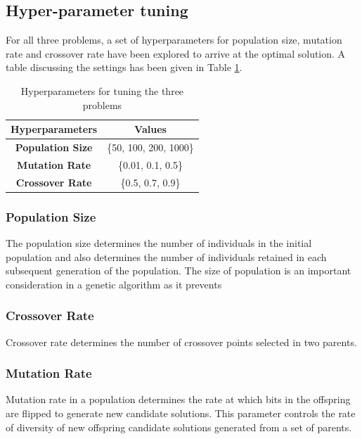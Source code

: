 \documentclass{article}
\begin{document}
\subsection{Hyper-parameter tuning}
For all three problems, a set of hyperparameters for population size, mutation rate and crossover rate have been explored to arrive at the optimal solution. A table discussing the settings has been given in Table \ref{tab:hyperparameter-tuning}. 
\begin{table}[h!]
    \centering
    \begin{tabular}{|c|c|} \hline 
        \textbf{Hyperparameters} & \textbf{Values}  \\ \hline
        \textbf{Population Size} & \{50, 100, 200, 1000\}  \\ \hline
        \textbf{Mutation Rate}   & \{0.01, 0.1, 0.5\} \\ \hline  
        \textbf{Crossover Rate}  & \{0.5, 0.7, 0.9\} \\ \hline
    \end{tabular}
    \caption{Hyperparameters for tuning the three problems}
    \label{tab:hyperparameter-tuning}
\end{table}

\subsubsection{Population Size}
The population size determines the number of individuals in the initial population and also determines the number of individuals retained in each subsequent generation of the population. The size of population is an important consideration in a genetic algorithm as it prevents 

\subsubsection{Crossover Rate}
Crossover rate determines the number of crossover points selected in two parents.

\subsubsection{Mutation Rate}
Mutation rate in a population determines the rate at which bits in the offspring are flipped to generate new candidate solutions. This parameter controls the rate of diversity of new offspring candidate solutions generated from a set of parents.  

\end{document}

